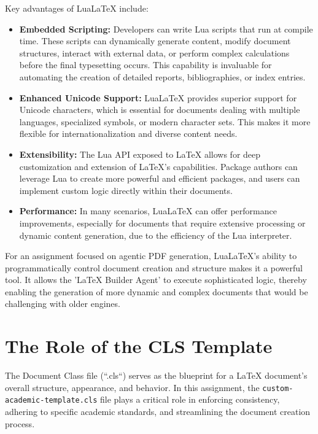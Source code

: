 \documentclass{custom-academic-template}
\begin{document}
Key advantages of LuaLaTeX include:
\begin{itemize}
    \item 	\textbf{Embedded Scripting:} Developers can write Lua scripts that run at compile time. These scripts can dynamically generate content, modify document structures, interact with external data, or perform complex calculations before the final typesetting occurs. This capability is invaluable for automating the creation of detailed reports, bibliographies, or index entries.
    \item 	\textbf{Enhanced Unicode Support:} LuaLaTeX provides superior support for Unicode characters, which is essential for documents dealing with multiple languages, specialized symbols, or modern character sets. This makes it more flexible for internationalization and diverse content needs.
    \item 	\textbf{Extensibility:} The Lua API exposed to LaTeX allows for deep customization and extension of LaTeX's capabilities. Package authors can leverage Lua to create more powerful and efficient packages, and users can implement custom logic directly within their documents.
    \item 	\textbf{Performance:} In many scenarios, LuaLaTeX can offer performance improvements, especially for documents that require extensive processing or dynamic content generation, due to the efficiency of the Lua interpreter.
\end{itemize}
For an assignment focused on agentic PDF generation, LuaLaTeX's ability to programmatically control document creation and structure makes it a powerful tool. It allows the 'LaTeX Builder Agent' to execute sophisticated logic, thereby enabling the generation of more dynamic and complex documents that would be challenging with older engines.

\section{The Role of the CLS Template}
The Document Class file (``.cls``) serves as the blueprint for a LaTeX document's overall structure, appearance, and behavior. In this assignment, the 	\texttt{custom-academic-template.cls} file plays a critical role in enforcing consistency, adhering to specific academic standards, and streamlining the document creation process.
\end{document}
